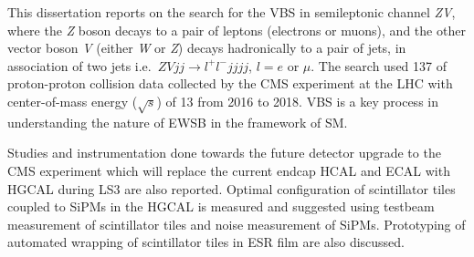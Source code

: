 This dissertation reports on the search for
the \gls{VBS} in semileptonic channel \textit{ZV},
where the \textit{Z} boson decays to a pair of leptons (electrons or muons),
and the other vector boson \textit{V} (either \textit{W} or \textit{Z})
decays hadronically to a pair of jets, in association of two jets
i.e.~\( \textit{ZV}jj \rightarrow l^{+}l^-jjjj \), \( l=e \) or \( \mu \).
The search used 137 \fbinv{} of proton-proton collision data collected by
the \gls{CMS} experiment at the \gls{LHC} with
center-of-mass energy (\( \sqrt{s} \)) of 13 \TeV{} from 2016 to 2018.
\gls{VBS} is a key process in understanding the nature of \gls{EWSB} in
the framework of \gls{SM}.

Studies and instrumentation done towards the future detector
upgrade to the \gls{CMS} experiment which will replace
the current endcap \gls{HCAL} and \gls{ECAL} with \gls{HGCAL}
during \gls{LS3} are also reported.
Optimal configuration
of scintillator tiles coupled to \glspl{SiPM}
in the \gls{HGCAL} is measured and suggested using testbeam measurement of
scintillator tiles and noise measurement of \glspl{SiPM}.
Prototyping of automated wrapping of scintillator tiles in \gls{ESR} film
are also discussed.
